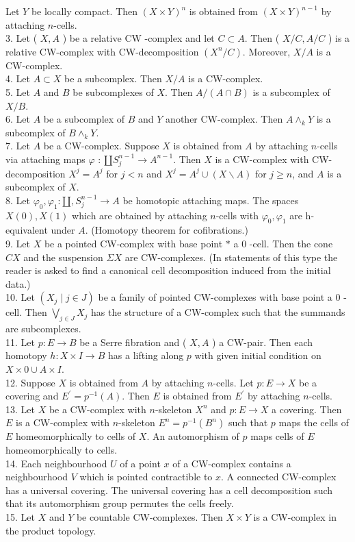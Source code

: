 \documentclass[10pt, letterpaper]{article}
\begin{document}
Let $Y$ be locally compact. Then $(X \times Y)^{n}$ is obtained from $(X \times Y)^{n-1}$ by attaching $n$-cells.\\
3. Let ( $X, A$ ) be a relative CW -complex and let $C \subset A$. Then ( $X / C, A / C$ ) is a relative CW-complex with CW-decomposition $\left(X^{n} / C\right)$. Moreover, $X / A$ is a CW-complex.\\
4. Let $A \subset X$ be a subcomplex. Then $X / A$ is a CW-complex.\\
5. Let $A$ and $B$ be subcomplexes of $X$. Then $A /(A \cap B)$ is a subcomplex of $X / B$.\\
6. Let $A$ be a subcomplex of $B$ and $Y$ another CW-complex. Then $A \wedge_{k} Y$ is a subcomplex of $B \wedge_{k} Y$.\\
7. Let $A$ be a CW-complex. Suppose $X$ is obtained from $A$ by attaching $n$-cells via attaching maps $\varphi$ : $\amalg S_{j}^{n-1} \rightarrow A^{n-1}$. Then $X$ is a CW-complex with CW-decomposition $X^{j}=A^{j}$ for $j<n$ and $X^{j}=A^{j} \cup(X \backslash A)$ for $j \geq n$, and $A$ is a subcomplex of $X$.\\
8. Let $\varphi_{0}, \varphi_{1}: \amalg, S_{j}^{n-1} \rightarrow A$ be homotopic attaching maps. The spaces $X(0), X(1)$ which are obtained by attaching $n$-cells with $\varphi_{0}, \varphi_{1}$ are h-equivalent under $A$. (Homotopy theorem for cofibrations.)\\
9. Let $X$ be a pointed CW-complex with base point $*$ a 0 -cell. Then the cone $C X$ and the suspension $\Sigma X$ are CW-complexes. (In statements of this type the reader is asked to find a canonical cell decomposition induced from the initial data.)\\
10. Let $\left(X_{j} \mid j \in J\right)$ be a family of pointed CW-complexes with base point a 0 -cell. Then $\bigvee_{j \in J} X_{j}$ has the structure of a CW-complex such that the summands are subcomplexes.\\
11. Let $p: E \rightarrow B$ be a Serre fibration and ( $X, A$ ) a CW-pair. Then each homotopy $h: X \times I \rightarrow B$ has a lifting along $p$ with given initial condition on $X \times 0 \cup A \times I$.\\
12. Suppose $X$ is obtained from $A$ by attaching $n$-cells. Let $p: E \rightarrow X$ be a covering and $E^{\prime}=p^{-1}(A)$. Then $E$ is obtained from $E^{\prime}$ by attaching $n$-cells.\\
13. Let $X$ be a CW-complex with $n$-skeleton $X^{n}$ and $p: E \rightarrow X$ a covering. Then $E$ is a CW-complex with $n$-skeleton $E^{n}=p^{-1}\left(B^{n}\right)$ such that $p$ maps the cells of $E$ homeomorphically to cells of $X$. An automorphism of $p$ maps cells of $E$ homeomorphically to cells.\\
14. Each neighbourhood $U$ of a point $x$ of a CW-complex contains a neighbourhood $V$ which is pointed contractible to $x$. A connected CW-complex has a universal covering. The universal covering has a cell decomposition such that its automorphism group permutes the cells freely.\\
15. Let $X$ and $Y$ be countable CW-complexes. Then $X \times Y$ is a CW-complex in the product topology.
\end{document}
